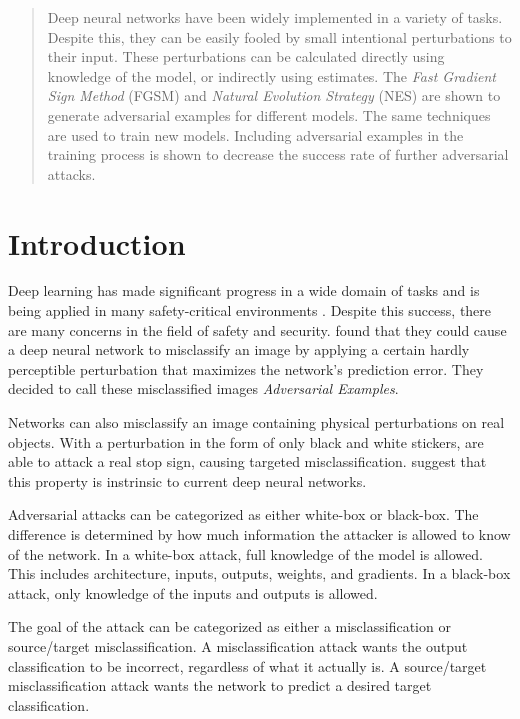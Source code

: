 \documentclass[12pt]{article}
\begin{document}
\maketitle

\begin{abstract}
Deep neural networks have been widely implemented in a variety of tasks.
Despite this, they can be easily fooled by small intentional perturbations to their input.
These perturbations can be calculated directly using knowledge of the model, or indirectly using estimates.
The \emph{Fast Gradient Sign Method} (FGSM) and \emph{Natural Evolution Strategy} (NES) are shown to generate adversarial examples for different models.
The same techniques are used to train new models.
Including adversarial examples in the training process is shown to decrease the success rate of further adversarial attacks.

\end{abstract}

\section{Introduction}
Deep learning has made significant progress in a wide domain of tasks and is being applied in many safety-critical environments \cite{yuan2017adversarial}.
Despite this success, there are many concerns in the field of safety and security.
\cite{szegedy2013intriguing} found that they could cause a deep neural network to misclassify an image by applying a certain hardly perceptible perturbation that maximizes the network's prediction error.
They decided to call these misclassified images \emph{Adversarial Examples}.

Networks can also misclassify an image containing physical perturbations on real objects.
With a perturbation in the form of only black and white stickers, \cite{eykholt2017robust} are able to attack a real stop sign, causing targeted misclassification.
\cite{szegedy2013intriguing} suggest that this property is instrinsic to current deep neural networks.

Adversarial attacks can be categorized as either white-box or black-box.
The difference is determined by how much information the attacker is allowed to know of the network.
In a white-box attack, full knowledge of the model is allowed.
This includes architecture, inputs, outputs, weights, and gradients.
In a black-box attack, only knowledge of the inputs and outputs is allowed.

The goal of the attack can be categorized as either a misclassification or source/target misclassification.
A misclassification attack wants the output classification to be incorrect, regardless of what it actually is.
A source/target misclassification attack wants the network to predict a desired target classification.
\end{document}
